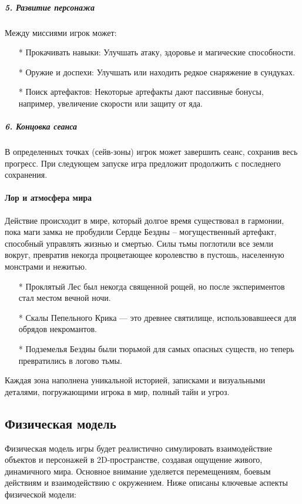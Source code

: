 \documentclass{article}
\begin{document}
\subparagraph{5. Развитие персонажа}
Между миссиями игрок может:
\begin{itemize}
\item[*] Прокачивать навыки: Улучшать атаку, здоровье и магические способности.
\item[*] Оружие и доспехи: Улучшать или находить редкое снаряжение в сундуках.
\item[*] Поиск артефактов: Некоторые артефакты дают пассивные бонусы, например, увеличение скорости или защиту от яда.
\end{itemize}
\subparagraph{6. Концовка сеанса \\}
В определенных точках (сейв-зоны) игрок может завершить сеанс, сохранив весь прогресс. При следующем запуске игра предложит продолжить с последнего сохранения. \\
\paragraph{Лор и атмосфера мира \\}
Действие происходит в мире, который долгое время существовал в гармонии, пока маги замка не пробудили Сердце Бездны – могущественный артефакт, способный управлять жизнью и смертью. Силы тьмы поглотили все земли вокруг, превратив некогда процветающее королевство в пустошь, населенную монстрами и нежитью.
\begin{itemize}
\item[*] Проклятый Лес был некогда священной рощей, но после экспериментов стал местом вечной ночи.
\item[*] Скалы Пепельного Крика — это древнее святилище, использовавшееся для обрядов некромантов.
\item[*] Подземелья Бездны были тюрьмой для самых опасных существ, но теперь превратились в логово тьмы.
\end{itemize}
Каждая зона наполнена уникальной историей, записками и визуальными деталями, погружающими игрока в мир, полный тайн и угроз.


\subsection{Физическая модель}
Физическая модель игры будет реалистично симулировать взаимодействие объектов и персонажей в 2D-пространстве, создавая ощущение живого, динамичного мира. Основное внимание уделяется перемещениям, боевым действиям и взаимодействию с окружением. Ниже описаны ключевые аспекты физической модели:
\end{document}
